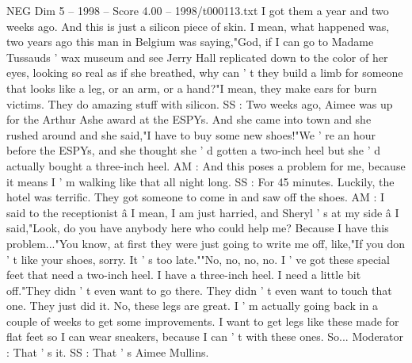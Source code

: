 \begin{textsample}{NEG Dim 5 – 1998 – Score 4.00 – 1998/t000113.txt}
I got them a year and two weeks ago.
And this is just a silicon piece of skin.
I mean, what happened was, two years ago this man in Belgium was saying,"God, if I can go to Madame Tussauds ' wax museum and see Jerry Hall replicated down to the color of her eyes, looking so real as if she breathed, why can ' t they build a limb for someone that looks like a leg, or an arm, or a hand?"I mean, they make ears for burn victims.
They do amazing stuff with silicon.
SS : Two weeks ago, Aimee was up for the Arthur Ashe award at the ESPYs.
And she came into town and she rushed around and she said,"I have to buy some new shoes!"We ' re an hour before the ESPYs, and she thought she ' d gotten a two-inch heel but she ' d actually bought a three-inch heel.
AM : And this poses a problem for me, because it means I ' m walking like that all night long.
SS : For 45 minutes.
Luckily, the hotel was terrific.
They got someone to come in and saw off the shoes.
AM : I said to the receptionist â I mean, I am just harried, and Sheryl ' s at my side â I said,"Look, do you have anybody here who could help me?
Because I have this problem..."You know, at first they were just going to write me off, like,"If you don ' t like your shoes, sorry.
It ' s too late.""No, no, no, no.
I ' ve got these special feet that need a two-inch heel.
I have a three-inch heel.
I need a little bit off."They didn ' t even want to go there.
They didn ' t even want to touch that one.
They just did it.
No, these legs are great.
I ' m actually going back in a couple of weeks to get some improvements.
I want to get legs like these made for flat feet so I can wear sneakers, because I can ' t with these ones.
So...
Moderator : That ' s it.
SS : That ' s Aimee Mullins.

\end{textsample}
